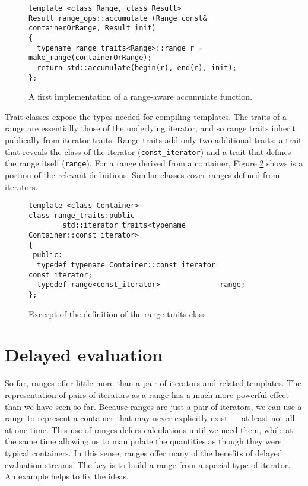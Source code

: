\documentclass[12pt]{article}
\begin{document}
\begin{figure}
\caption{ \label{fi:simple-accumulate}
A first implementation of a range-aware accumulate function.}
\begin{verbatim}
template <class Range, class Result>
Result range_ops::accumulate (Range const& containerOrRange, Result init)
{
  typename range_traits<Range>::range r = make_range(containerOrRange);
  return std::accumulate(begin(r), end(r), init);
};
\end{verbatim}
\end{figure}


  Trait classes expose the types needed for compiling templates.  The
traits of a range are essentially those of the underlying iterator,
and so range traits inherit publically from iterator traits.  Range
traits add only two additional traits: a trait that reveals the class
of the iterator ({\tt const\_iterator}) and a trait that defines the
range itself ({\tt range}).  For a range derived from a container,
Figure \ref{fi:range-traits} shows is a portion of the relevant
definitions.  Similar classes cover ranges defined from iterators.


\begin{figure}
\caption{ \label{fi:range-traits}
Excerpt of the definition of the range traits class.}
\begin{verbatim}
template <class Container>
class range_traits:public 
        std::iterator_traits<typename Container::const_iterator>
{
 public:
  typedef typename Container::const_iterator const_iterator;
  typedef range<const_iterator>              range;
};
\end{verbatim}
\end{figure}



\section{Delayed evaluation}

  So far, ranges offer little more than a pair of iterators and
related templates.  The representation of pairs of iterators as a
range has a much more powerful effect than we have seen so far.
Because ranges are just a pair of iterators, we can use a range to
represent a container that may never explicitly exist --- at least not
all at one time.  This use of ranges defers calculations until we need
them, while at the same time allowing us to manipulate the quantities
as though they were typical containers.  In this sense, ranges offer
many of the benefits of delayed evaluation streams.  The key is to
build a range from a special type of iterator.  An example helps to
fix the ideas.
\end{document}
